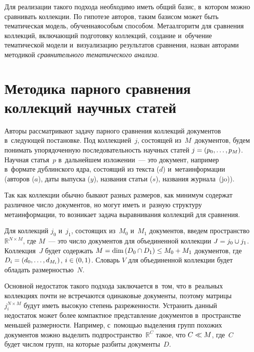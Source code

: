 \begin{multicols}{2}
    Для реализации такого подхода необходимо иметь общий базис, в~котором 
можно сравнивать коллекции.
    По гипотезе авторов, таким базисом может быть тематическая модель, 
обученная\linebreak особым способом.
    Метаалгоритм для сравнения коллекций, включающий подготовку коллекций, 
создание и~обучение тематической модели и~\mbox{визуализацию} результатов сравнения, 
назван авторами методикой \textit{сравнительного тематического анализа}. 


    
    \section{Методика парного сравнения коллекций научных статей}
    
    Авторы рассматривают задачу парного сравнения коллекций документов в~следующей 
    постановке.
    Под коллекцией~$j$, состоящей из~$M$~документов, будем понимать 
упорядоченную последовательность научных статей $j \hm= \left(p_0, \dots , p_M 
\right)$.
    Научная статья~$p$ в~дальнейшем изложении~--- это документ, например 
    в~формате дублинского ядра, состоящий из текста ($d$) и~метаинформации (авторов 
($a$), даты выпуска ($y$), названия статьи ($s$), названия журнала~(jo)).
    
    Так как коллекции обычно бывают разных размеров, как минимум содержат 
различное число документов, но могут иметь и~разную структуру метаинформации, то 
возникает задача выравнивания коллекций для сравнения.
    
    Для коллекций $j_0$ и~$j_1$,  состоящих из~$M_0$ и~$M_1$ документов, введем 
пространство $\mathbb{R}^{N \times M}$,
где $M$~--- это число документов для объединенной коллекции $J \hm= j_0 \cup 
j_1 $.
    Коллекция~$J$ будет содержать $M \hm= \mathrm{dim}\left( D_0 \cap D_1 \right)
    \hm \le  M_0 \hm+ M_1 $ 
документов, где $D_i\hm = (d_0, \dots , d_{M_i})$, $i \hm\in (0,1)$.
    Словарь $V$ для объединенной коллекции будет обладать раз\-мер\-ностью~$N$.
    {
    
    }
    
    Основной недостаток такого подхода заключается в~том, что в~реальных 
коллекциях почти не встречаются одинаковые документы,
поэтому мат\-ри\-цы~$j_i^{N \times M}$ будут иметь высокую степень 
разреженности.
        Устранить данный недостаток может более компактное представление 
документов в~пространстве меньшей размерности.
    Например, с~помощью выделения групп похожих документов можно выделить 
подпространство~$\mathbb{R}^C$ такое, что $C \hm\ll M$, где~$C$  будет числом 
групп, на которые разбиты документы~$D$.
    

\end{multicols}
